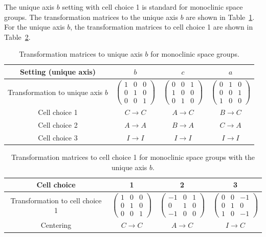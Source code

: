 The unique axis $b$ setting with cell choice 1 is standard for monoclinic space groups.
The transformation matrices to the unique axis $b$ are shown in Table~\ref{tab:monoclinic-settings}.
For the unique axis $b$, the transformation matrices to cell choice 1 are shown in Table~\ref{tab:monoclinic-cell-choice}.

\begin{table}[htb]
  \centering
  \small
  \caption{Transformation matrices to unique axis $b$ for monoclinic space groups.}
  \label{tab:monoclinic-settings}
  \begin{tabular}{c|ccc}
    \hline\hline
    Setting (unique axis) & $b$ & $c$ & $a$ \\
    \hline
    Transformation to unique axis $b$ &
      $\begin{pmatrix} 1& 0&0 \\ 0& 1&0 \\ 0& 0&1 \end{pmatrix}$ &
      $\begin{pmatrix}0& 0&1 \\1& 0&0 \\0& 1&0\end{pmatrix}$ &
      $\begin{pmatrix} 0&1&0 \\ 0&0&1 \\ 1&0&0 \end{pmatrix}$ \\
    Cell choice 1 & $C \to C$ & $A \to C$ & $B \to C$ \\
    Cell choice 2 & $A \to A$ & $B \to A$ & $C \to A$ \\
    Cell choice 3 & $I \to I$ & $I \to I$ & $I \to I$ \\
    \hline\hline
  \end{tabular}
\end{table}

\begin{table}[htb]
  \centering
  \caption{Transformation matrices to cell choice 1 for monoclinic space groups with the unique axis $b$.}
  \label{tab:monoclinic-cell-choice}
  \begin{tabular}{c|ccc}
    \hline\hline
    Cell choice & 1 & 2 & 3 \\
    \hline
    Transformation to cell choice 1
      & $\begin{pmatrix} 1&0&0\\0&1&0\\0&0&1 \end{pmatrix}$
      & $\begin{pmatrix} -1&0&1\\0&1&0\\-1&0&0 \end{pmatrix}$
      & $\begin{pmatrix} 0&0&-1\\0&1&0\\1&0&-1 \end{pmatrix}$ \\
    Centering & $C \to C$ & $A \to C$ & $I \to C$ \\
    \hline\hline
  \end{tabular}
\end{table}

